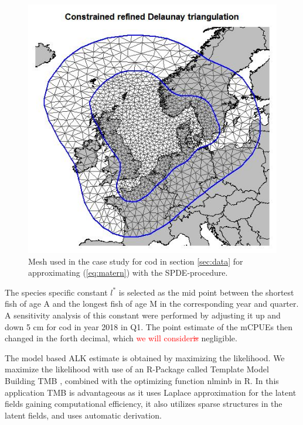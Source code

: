 \documentclass[a4paper 12pt]{article}
\numberwithin{equation}{section}
\newcommand{\ed}[1]{\textcolor{red}{#1}}
\begin{document}
{\begin{figure}[h!]
\begin{center}
\includegraphics[scale=0.5]{figures/mesh.jpeg}
 \caption{Mesh used in the case study for cod in section \ref{sec:data} for approximating (\ref{eq:matern}) with the SPDE-procedure.}\label{fig:mesh}
\end{center}
\end{figure}


The species specific constant $l^*$ is selected as the mid point between the shortest fish of age A and the longest fish of age M in the corresponding year and quarter. A sensitivity analysis of this constant were performed by adjusting it up and down 5 cm for cod in year 2018 in Q1. The point estimate of the mCPUEs then changed in the forth decimal, which \ed{we will consider\sout{is}} negligible.

The model based ALK estimate is obtained by maximizing the likelihood. We maximize the likelihood with use of an R-Package called Template Model Building {\sffamily TMB} \citep{kristensen2015tmb}, combined with the optimizing function {\sffamily nlminb} in R. In this application {\sffamily TMB} is advantageous as it uses Laplace approximation for the latent fields gaining computational efficiency, it also utilizes sparse structures in the latent fields, and uses automatic derivation. 

}
\end{document}
